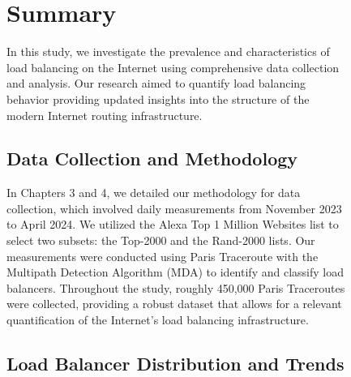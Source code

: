 \documentclass[12pt]{cwru_thesis}
\begin{document}
\begin{figure}[h!]
\chapter{Summary}
In this study, we investigate the prevalence and characteristics of load balancing on the Internet using comprehensive data collection and analysis. Our research aimed to quantify load balancing behavior providing updated insights into the structure of the modern Internet routing infrastructure.

\section*{Data Collection and Methodology}

In Chapters 3 and 4, we detailed our methodology for data collection, which involved daily measurements from November 2023 to April 2024. We utilized the Alexa Top 1 Million Websites list to select two subsets: the Top-2000 and the Rand-2000 lists. Our measurements were conducted using Paris Traceroute with the Multipath Detection Algorithm (MDA) to identify and classify load balancers. Throughout the study, roughly 450,000 Paris Traceroutes were collected, providing a robust dataset that allows for a relevant quantification of the Internet's load balancing infrastructure.

\section*{Load Balancer Distribution and Trends}


\end{figure}
\end{document}
